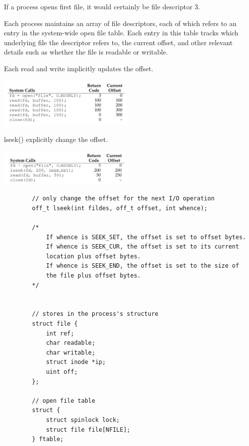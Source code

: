         If a process opens first file, it would certainly be file descriptor 3.

        Each process maintains an array of file descriptors, each of which 
        refers to an entry in the system-wide open file table.
        Each entry in this table tracks which underlying file the descriptor refers to,
         the current offset, 
         and other relevant details such as whether the file is readable or writable.




        Each read and write implicitly updates the offset.

        \includegraphics[width=0.5\textwidth]{chapters/Persistence/persistence/use_read.png}


        lseek() explicitly change the offset.

        \includegraphics[width=0.5\textwidth]{chapters/Persistence/persistence/lseek.png}


    \begin{lstlisting}
        // only change the offset for the next I/O operation
        off_t lseek(int fildes, off_t offset, int whence);

        /*
            If whence is SEEK_SET, the offset is set to offset bytes.
            If whence is SEEK_CUR, the offset is set to its current
            location plus offset bytes.
            If whence is SEEK_END, the offset is set to the size of
            the file plus offset bytes.
        */


        // stores in the process's structure
        struct file {
            int ref;
            char readable;
            char writable;
            struct inode *ip;
            uint off;
        };

        // open file table  
        struct {
            struct spinlock lock;
            struct file file[NFILE];
        } ftable;
    \end{lstlisting}

    



















